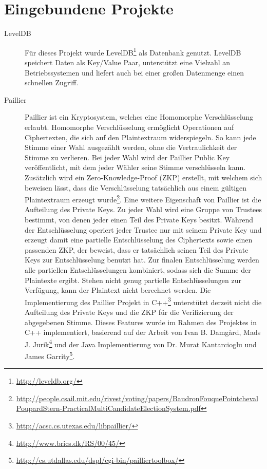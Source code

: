 \documentclass[colorback,accentcolor=tud1b]{tudreport}
\begin{document}
\section{Eingebundene Projekte}
\begin{description}
\item[LevelDB] Für dieses Projekt wurde LevelDB\footnote{\url{http://leveldb.org/}} als Datenbank genutzt. LevelDB speichert Daten als Key/Value Paar, unterstützt eine Vielzahl an Betriebssystemen und liefert auch bei einer großen Datenmenge einen schnellen Zugriff.

\item[Paillier] Paillier ist ein Kryptosystem, welches eine Homomorphe Verschlüsselung erlaubt. Homomorphe Verschlüsselung ermöglicht Operationen auf Ciphertexten, die sich auf den Plaintextraum widerspiegeln. So kann jede Stimme einer Wahl ausgezählt werden, ohne die Vertraulichkeit der Stimme zu verlieren. Bei jeder Wahl wird der Paillier Public Key veröffentlicht, mit dem jeder Wähler seine Stimme verschlüsseln kann. Zusätzlich wird ein Zero-Knowledge-Proof (ZKP) erstellt, mit welchem sich beweisen lässt, dass die Verschlüsselung tatsächlich aus einem gültigen Plaintextraum erzeugt wurde\footnote{\url{http://people.csail.mit.edu/rivest/voting/papers/BaudronFouquePointchevalPoupardStern-PracticalMultiCandidateElectionSystem.pdf}}. Eine weitere Eigenschaft von Paillier ist die Aufteilung des Private Keys. Zu jeder Wahl wird eine Gruppe von Trustees bestimmt, von denen jeder einen Teil des Private Keys besitzt. Während der Entschlüsselung operiert jeder Trustee nur mit seinem Private Key und erzeugt damit eine partielle Entschlüsselung des Ciphertexts sowie einen passenden ZKP, der beweist, dass er tatsächlich seinen Teil des Private Keys zur Entschlüsselung benutzt hat. Zur finalen Entschlüsselung werden alle partiellen Entschlüsselungen kombiniert, sodass sich die Summe der Plaintexte ergibt. Stehen nicht genug partielle Entschlüsselungen zur Verfügung, kann der Plaintext nicht berechnet werden.
\newline
Die Implementierung des Paillier Projekt in C++\footnote{\url{http://acsc.cs.utexas.edu/libpaillier/}} unterstützt derzeit nicht die Aufteilung des Private Keys und die ZKP für die Verifizierung der abgegebenen Stimme. Dieses Features wurde im Rahmen des Projektes in C++ implementiert, basierend auf der Arbeit von Ivan B. Damgård, Mads J. Jurik\footnote{\url{http://www.brics.dk/RS/00/45/}} und der Java Implementierung von Dr. Murat Kantarcioglu und James Garrity\footnote{\url{http://cs.utdallas.edu/dspl/cgi-bin/pailliertoolbox/}}. 


\end{description}
\end{document}
